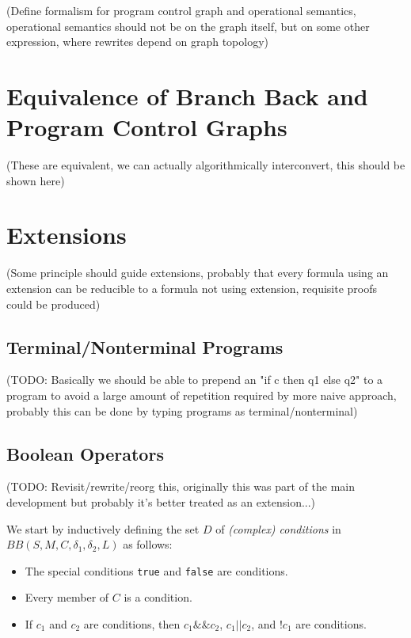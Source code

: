 \documentclass[11pt]{article}
\begin{document}
(Define formalism for program control graph and operational semantics, operational semantics should not be on the graph itself, but on some other expression, where rewrites depend on graph topology)

\section{Equivalence of Branch Back and Program Control Graphs}

(These are equivalent, we can actually algorithmically interconvert, this should be shown here)

\section{Extensions}

(Some principle should guide extensions, probably that every formula using an extension can be reducible to a formula not using extension, requisite proofs could be produced)

\subsection{Terminal/Nonterminal Programs}

(TODO: Basically we should be able to prepend an "if c then q1 else q2" to a program to avoid a large amount of repetition required by more naive approach, probably this can be done by typing programs as terminal/nonterminal)

\subsection{Boolean Operators}

(TODO: Revisit/rewrite/reorg this, originally this was part of the main development but probably it's better treated as an extension...)

We start by inductively defining the set $D$ of \emph{(complex) conditions} in $BB(S, M, C, \delta_{1}, \delta_{2}, L)$ as follows:

\begin{itemize}
\item The special conditions \texttt{true} and \texttt{false} are conditions.
\item Every member of $C$ is a condition.
\item If $c_{1}$ and $c_{2}$ are conditions, then $c_{1} \texttt{\&\&} c_{2}$, $c_{1} \texttt{||} c_{2}$, and $\texttt{!} c_{1}$ are conditions.
\end{itemize}
\end{document}
